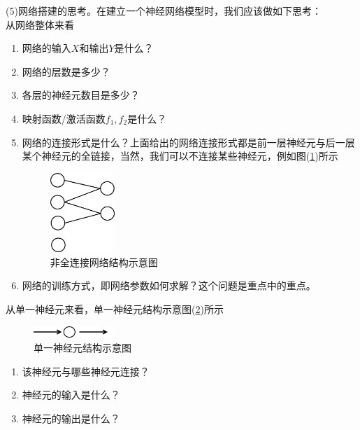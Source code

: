            (5)网络搭建的思考。在建立一个神经网络模型时，我们应该做如下思考：\\
            从网络整体来看
            \begin{enumerate}
            \item 网络的输入$X$和输出$Y$是什么？
            \item 网络的层数是多少？
            \item 各层的神经元数目是多少？
            \item 映射函数/激活函数$f_1,f_2$是什么？
            \item 网络的连接形式是什么？上面给出的网络连接形式都是前一层神经元与后一层某个神经元的全链接，当然，我们可以不连接某些神经元，例如图(\ref{fig:非全连接网络结构示意图})所示
            \begin{figure}[H]
            \centering
            \includegraphics[height=3cm]{images/non_full_connect_net_structure.jpg}
            \caption{非全连接网络结构示意图}
            \label{fig:非全连接网络结构示意图}
            \end{figure}
            \item 网络的训练方式，即网络参数如何求解？这个问题是重点中的重点。
            \end{enumerate}
            从单一神经元来看，单一神经元结构示意图(\ref{fig:单一神经元结构示意图})所示
            \begin{figure}[H]
            \centering
            \includegraphics[width=3cm]{images/single_neuron_structure.jpg}
            \caption{单一神经元结构示意图}
            \label{fig:单一神经元结构示意图}
            \end{figure}
            \begin{enumerate}
            \item 该神经元与哪些神经元连接？
            \item 神经元的输入是什么？
            \item 神经元的输出是什么？
            \end{enumerate}
